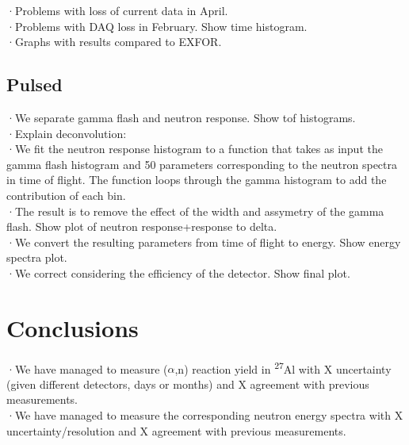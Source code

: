 \documentclass[a4paper,12pt]{report}
\newcommand{\an}{($\alpha$,n) }
\newcommand{\Aliso}{\textsuperscript{27}Al }
\begin{document}
·Problems with loss of current data in April.\\
·Problems with DAQ loss in February. Show time histogram.\\

·Graphs with results compared to EXFOR.\\

\section{Pulsed}
·We separate gamma flash and neutron response. Show tof histograms.\\
·Explain deconvolution:\\
·We fit the neutron response histogram to a function that takes as input the gamma flash histogram and 50 parameters corresponding to the neutron spectra in time of flight. The function loops through the gamma histogram to add the contribution of each bin.\\
·The result is to remove the effect of the width and assymetry of the gamma flash. Show plot of neutron response+response to delta.\\

·We convert the resulting parameters from time of flight to energy. Show energy spectra plot.\\
·We correct considering the efficiency of the detector. Show final plot.\\


\chapter{Conclusions}
·We have managed to measure \an reaction yield in \Aliso with X uncertainty (given different detectors, days or months) and X agreement with previous measurements.\\
·We have managed to measure the corresponding neutron energy spectra with X uncertainty/resolution and X agreement with previous measurements.\\
\end{document}

